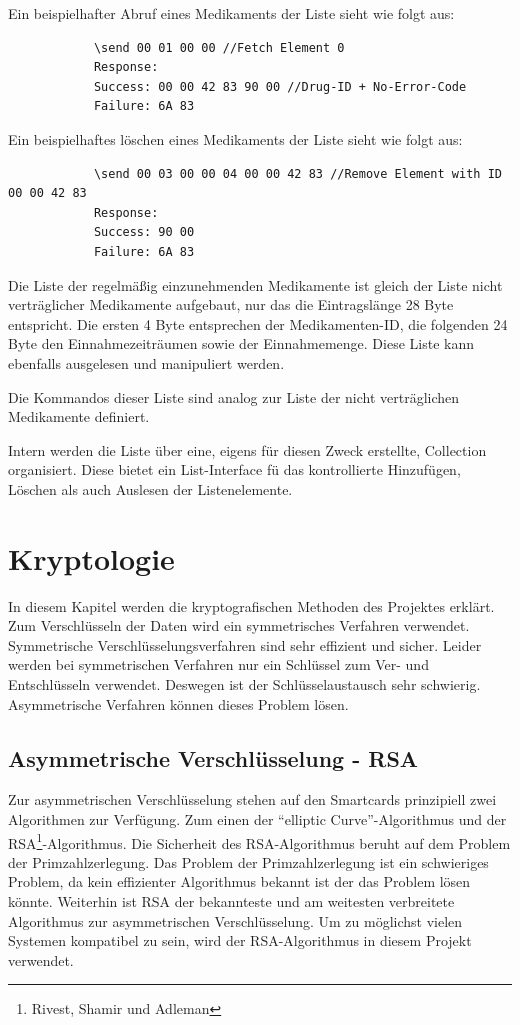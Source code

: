 \documentclass[parskip]{scrartcl}
\begin{document}
		Ein beispielhafter Abruf eines Medikaments der Liste sieht wie folgt aus:
		
		\begin{lstlisting}
			\send 00 01 00 00 //Fetch Element 0
			Response:
			Success: 00 00 42 83 90 00 //Drug-ID + No-Error-Code
			Failure: 6A 83
		\end{lstlisting}
		
		Ein beispielhaftes löschen eines Medikaments der Liste sieht wie folgt aus:
			
		\begin{lstlisting}
			\send 00 03 00 00 04 00 00 42 83 //Remove Element with ID 00 00 42 83
			Response:
			Success: 90 00
			Failure: 6A 83
		\end{lstlisting}
		
		Die Liste der regelmäßig einzunehmenden Medikamente ist gleich der Liste nicht verträglicher Medikamente aufgebaut, nur das die Eintragslänge 28 Byte entspricht. Die ersten 4 Byte entsprechen der Medikamenten-ID, die folgenden 24 Byte den Einnahmezeiträumen sowie der Einnahmemenge. Diese Liste kann ebenfalls ausgelesen und manipuliert werden.
		
		Die Kommandos dieser Liste sind analog zur Liste der nicht verträglichen Medikamente definiert.
		
		Intern werden die Liste über eine, eigens für diesen Zweck erstellte, Collection organisiert. Diese bietet ein List-Interface fü das kontrollierte Hinzufügen, Löschen als auch Auslesen der Listenelemente.
	\section{Kryptologie}
		In diesem Kapitel werden die kryptografischen Methoden des Projektes erklärt. Zum Verschlüsseln der Daten wird ein symmetrisches Verfahren verwendet. Symmetrische Verschlüsselungsverfahren sind sehr effizient und sicher. Leider werden bei symmetrischen Verfahren nur ein Schlüssel zum Ver- und Entschlüsseln verwendet. Deswegen ist der Schlüsselaustausch sehr schwierig. Asymmetrische Verfahren können dieses Problem lösen.
		\subsection{Asymmetrische Verschlüsselung - RSA}
			Zur asymmetrischen Verschlüsselung stehen auf den Smartcards prinzipiell zwei Algorithmen zur Verfügung. Zum einen der \enquote{elliptic Curve}-Algorithmus und der RSA\footnote{Rivest, Shamir und Adleman}-Algorithmus. Die Sicherheit des RSA-Algorithmus beruht auf dem Problem der Primzahlzerlegung. Das Problem der Primzahlzerlegung ist ein schwieriges Problem, da kein effizienter Algorithmus bekannt ist der das Problem lösen könnte. Weiterhin ist RSA der bekannteste und am weitesten verbreitete Algorithmus zur asymmetrischen Verschlüsselung. Um zu möglichst vielen Systemen kompatibel zu sein, wird der RSA-Algorithmus in diesem Projekt verwendet.
			
\end{document}
